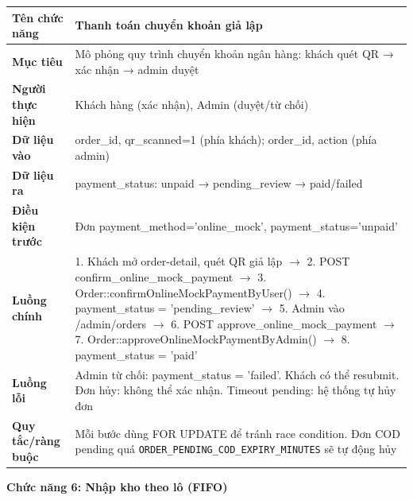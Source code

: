 \documentclass[a4paper]{article}
\begin{document}
\begin{longtable}{|p{3.5cm}|p{10.5cm}|}
\hline
\textbf{Tên chức năng} & Thanh toán chuyển khoản giả lập \\
\hline
\textbf{Mục tiêu} & Mô phỏng quy trình chuyển khoản ngân hàng: khách quét QR → xác nhận → admin duyệt \\
\hline
\textbf{Người thực hiện} & Khách hàng (xác nhận), Admin (duyệt/từ chối) \\
\hline
\textbf{Dữ liệu vào} & order\_id, qr\_scanned=1 (phía khách); order\_id, action (phía admin) \\
\hline
\textbf{Dữ liệu ra} & payment\_status: unpaid → pending\_review → paid/failed \\
\hline
\textbf{Điều kiện trước} & Đơn payment\_method='online\_mock', payment\_status='unpaid' \\
\hline
\textbf{Luồng chính} & 1. Khách mở order-detail, quét QR giả lập $\to$ 2. POST confirm\_online\_mock\_payment $\to$ 3. Order::confirmOnlineMockPaymentByUser() $\to$ 4. payment\_status = 'pending\_review' $\to$ 5. Admin vào /admin/orders $\to$ 6. POST approve\_online\_mock\_payment $\to$ 7. Order::approveOnlineMockPaymentByAdmin() $\to$ 8. payment\_status = 'paid' \\
\hline
\textbf{Luồng lỗi} & Admin từ chối: payment\_status = 'failed'. Khách có thể resubmit. Đơn hủy: không thể xác nhận. Timeout pending: hệ thống tự hủy đơn \\
\hline
\textbf{Quy tắc/ràng buộc} & Mỗi bước dùng FOR UPDATE để tránh race condition. Đơn COD pending quá \texttt{ORDER\_PENDING\_COD\_EXPIRY\_MINUTES} sẽ tự động hủy \\
\hline
\end{longtable}

\vspace{0.5cm}
\noindent\textbf{Chức năng 6: Nhập kho theo lô (FIFO)}
\end{document}
